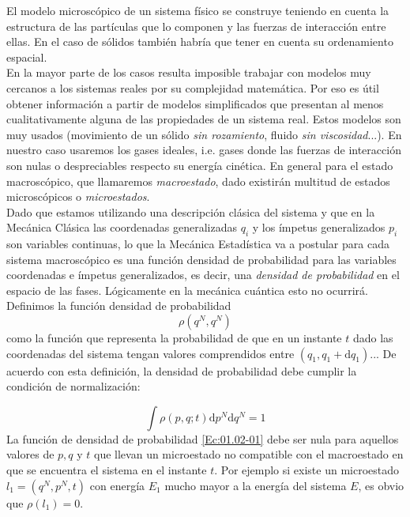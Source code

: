 \documentclass[12pt,a4paper]{article}
\numberwithin{equation}{section}
\numberwithin{figure}{section}
\newcommand{\D}{\mathrm{d}}
\theoremstyle{definition}
\begin{document}
El modelo microscópico de un sistema físico se construye teniendo en cuenta la estructura de las partículas que lo componen y las fuerzas de interacción entre ellas. En el caso de sólidos también habría que tener en cuenta su ordenamiento espacial. \\

En la mayor parte de los casos resulta imposible trabajar con modelos muy cercanos a los sistemas reales por su complejidad matemática. Por eso es útil obtener información a partir de modelos simplificados que presentan al menos cualitativamente alguna de las propiedades de un sistema real. Estos modelos son muy usados (movimiento de un sólido \textit{sin rozamiento}, fluido \textit{sin viscosidad}...). En nuestro caso usaremos los gases ideales, i.e. gases donde las fuerzas de interacción son nulas o despreciables respecto su energía cinética. En general para el estado macroscópico, que llamaremos \textit{macroestado}, dado existirán multitud de estados microscópicos o \textit{microestados}. \\

Dado que estamos utilizando una descripción clásica del sistema y que en la Mecánica Clásica las coordenadas generalizadas $q_i$ y los ímpetus generalizados $p_i$ son variables continuas, lo que la Mecánica Estadística va a postular para cada sistema macroscópico es una función densidad de probabilidad para las variables coordenadas e ímpetus generalizados, es decir, una \textit{densidad de probabilidad} en el espacio de las fases. Lógicamente en la mecánica cuántica esto no ocurrirá. Definimos la función densidad de probabilidad \\

\begin{equation}
\rho (q^N,q^N) \label{Ec:01.02-02}
\end{equation}
como la función que representa la probabilidad de que en un instante $t$ dado las coordenadas del sistema tengan valores comprendidos entre $(q_1,q_1+\D q_1)...$ De acuerdo con esta definición, la densidad de probabilidad debe cumplir la condición de normalización:

\begin{equation}
\int \rho (p,q;t) \D p^N \D q^N = 1
\end{equation}
La función de densidad de probabilidad \ref{Ec:01.02-01} debe ser nula para aquellos valores de $p,q$ y $t$ que llevan un microestado no compatible con el macroestado en que se encuentra el sistema en el instante $t$. Por ejemplo si existe un microestado $l_1 = (q^N,p^N,t)$ con energía $E_1$ mucho mayor a la energía del sistema $E$, es obvio que $\rho (l_1) = 0$. \\
\end{document}
